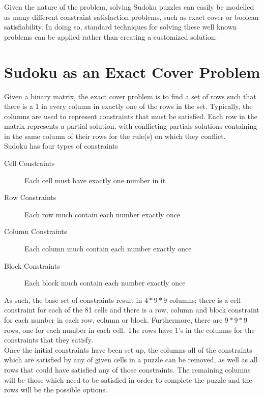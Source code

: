 \documentclass[12pt]{article}
\newcounter{row}
\newcounter{col}
\begin{document}
Given the nature of the problem, solving Sudoku puzzles can easily be modelled as many different constraint satisfaction problems, such as exact cover or boolean satisfiability. In doing so, standard techniques for solving these well known problems can be applied rather than creating a customized solution.  \\

\section{Sudoku as an Exact Cover Problem}
Given a binary matrix, the exact cover problem is to find a set of rows such that there is a 1 in every column in exactly one of the rows in the set. Typically, the columns are used to represent constraints that must be satisfied. Each row in the matrix represents a partial solution, with conflicting partials solutions containing in the same column of their rows for the rule(s) on which they conflict. \\

Sudoku has four types of constraints
\begin{description}
\item[Cell Constraints] Each cell must have exactly one number in it
\item[Row Constraints] Each row much contain each number exactly once
\item[Column Constraints] Each column much contain each number exactly once
\item[Block Constraints] Each block much contain each number exactly once
\end{description}
As such, the base set of constraints result in $4*9*9$ columns; there is a cell constraint for each of the 81 cells and there is a row, column and block constraint for each number in each row, column or block. Furthermore, there are $9*9*9$ rows, one for each number in each cell. The rows have 1's in the columns for the constraints that they satisfy. \\

Once the initial constraints have been set up, the columns all of the constraints which are satisfied by any of given cells in a puzzle can be removed, as well as all rows that could have satisfied any of those constraints. The remaining columns will be those which need to be satisfied in order to complete the puzzle and the rows will be the possible options.
\end{document}
